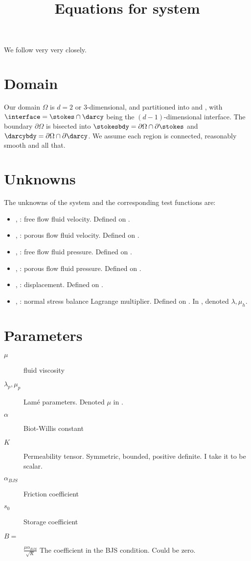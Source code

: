 \documentclass{article}
\begin{document}
\title{Equations for system}
\maketitle


We follow \cite{ambartsumyan} very very closely.

\section{Domain}
Our domain $\Omega$ is $d=2 \text{ or } 3$-dimensional, and partitioned into \stokes and \darcy, with $\interface = \stokes \cap \darcy$ being the $(d-1)$-dimensional interface. The boundary $\partial \Omega$ is bisected into $\stokesbdy = \partial \Omega \cap \partial \stokes$ and $\darcybdy = \partial \Omega \cap \partial \darcy$. We assume each region is connected, reasonably smooth and all that.

\section{Unknowns}
The unknowns of the system and the corresponding test functions are:

\begin{itemize}
\item \uf, \vf : free flow fluid velocity. Defined on \stokes.
\item \up, \vp : porous flow fluid velocity. Defined on \darcy.
\item \pf, \wf : free flow fluid pressure. Defined on \stokes.
\item \pp, \wp : porous flow fluid pressure. Defined on \darcy.
\item \disp, \disptest : displacement. Defined on \darcy.
\item \mult, \multtest : normal stress balance Lagrange multiplier. Defined on \interface. In \cite{ambartsumyan}, denoted $\lambda, \mu_h$.

\end{itemize}

\section{Parameters}

\begin{description}
\item[$\mu$] fluid viscosity
  
\item[$\lambda_p, \mu_p$] Lamé parameters. Denoted $\mu$ in \cite{ambartsumyan}.
\item[$\alpha$] Biot-Willis constant
\item[$K$] Permeability tensor. Symmetric, bounded, positive definite. I take it to be scalar.
\item[$\alpha_{BJS}$] Friction coefficient
\item[$s_0$] Storage coefficient
\item[$B=$] $\frac {\mu \alpha_{BJS}} {\sqrt{K}}$ The coefficient in the BJS condition. Could be zero.
\end{description}
\end{document}
